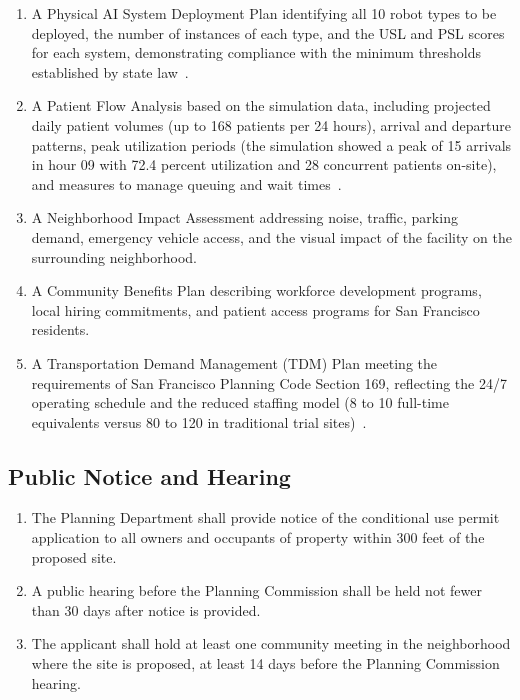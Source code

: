 \documentclass[11pt,letterpaper]{article}
\begin{document}
\begin{enumerate}[label=(\alph*)]
\item A Physical AI System Deployment Plan identifying all 10 robot types to be
  deployed, the number of instances of each type, and the USL and PSL scores
  for each system, demonstrating compliance with the minimum thresholds
  established by state law~\cite{usl2026,pslframework2026}.

\item A Patient Flow Analysis based on the simulation data, including projected
  daily patient volumes (up to 168 patients per 24 hours), arrival and
  departure patterns, peak utilization periods (the simulation showed a peak
  of 15 arrivals in hour 09 with 72.4 percent utilization and 28 concurrent
  patients on-site), and measures to manage queuing and
  wait times~\cite{newtrial2026}.

\item A Neighborhood Impact Assessment addressing noise, traffic, parking
  demand, emergency vehicle access, and the visual impact of the facility on
  the surrounding neighborhood.

\item A Community Benefits Plan describing workforce development programs,
  local hiring commitments, and patient access programs for San Francisco
  residents.

\item A Transportation Demand Management (TDM) Plan meeting the requirements
  of San Francisco Planning Code Section 169, reflecting the 24/7 operating
  schedule and the reduced staffing model (8 to 10 full-time equivalents
  versus 80 to 120 in traditional trial sites)~\cite{sitespec2026}.
\end{enumerate}

\subsection{Public Notice and Hearing}

\begin{enumerate}[label=(\alph*)]
\item The Planning Department shall provide notice of the conditional use
  permit application to all owners and occupants of property within 300 feet
  of the proposed site.

\item A public hearing before the Planning Commission shall be held not fewer
  than 30 days after notice is provided.

\item The applicant shall hold at least one community meeting in the
  neighborhood where the site is proposed, at least 14 days before the
  Planning Commission hearing.
\end{enumerate}
\end{document}
